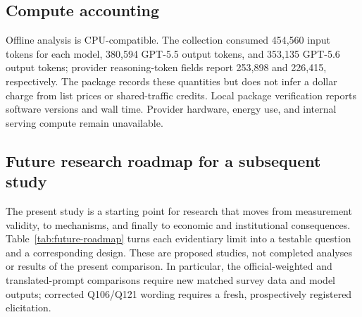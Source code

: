 \subsection{Compute accounting}
Offline analysis is CPU-compatible. The collection consumed 454,560 input tokens for
each model, 380,594 GPT-5.5 output tokens, and 353,135 GPT-5.6 output tokens; provider
reasoning-token fields report 253,898 and 226,415, respectively. The package records
these quantities but does not infer a dollar charge from list prices or shared-traffic
credits. Local package verification reports software versions and wall time. Provider
hardware, energy use, and internal serving compute remain unavailable.

\subsection{Future research roadmap for a subsequent study}
\label{app:future-roadmap}

The present study is a starting point for research that moves from measurement validity,
to mechanisms, and finally to economic and institutional consequences. Table~\ref{tab:future-roadmap}
turns each evidentiary limit into a testable question and a corresponding design. These are
proposed studies, not completed analyses or results of the present comparison. In
particular, the official-weighted and translated-prompt comparisons require
new matched survey data and model outputs; corrected Q106/Q121 wording requires
a fresh, prospectively registered elicitation.

